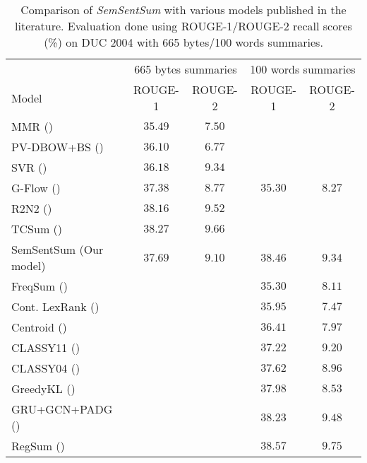 \documentclass{article}
\begin{document}
\begin{table}
  \caption{Comparison of \textit{SemSentSum} with various models published in the
literature. Evaluation done using ROUGE-1/ROUGE-2 recall scores (\%) on DUC 2004 with 665 bytes/100 words summaries.}
\label{sum_perf}
  \centering
  \begin{tabular}{lcccc}
    \toprule
    & \multicolumn{2}{c}{665 bytes summaries} & \multicolumn{2}{c}{100 words summaries} \\
    Model & ROUGE-1 & ROUGE-2 & ROUGE-1 & ROUGE-2  \\
    \hline
    MMR \scriptsize{(\citet{bennani2018embedrank}}) & $35.49$ & $7.50$ & & \\
    PV-DBOW+BS \scriptsize{(\citet{mani2017multi}}) & $36.10$ & $6.77$ & & \\
    SVR \scriptsize{(\citet{li2007multi}}) & $36.18$ & $9.34$ & & \\
    G-Flow \scriptsize{(\citet{christensen2013towards}}) & $37.38$ & $8.77$ & $35.30$ & $8.27$\\
    R2N2 \scriptsize{(\citet{cao2015ranking}}) & $38.16$ & $9.52$ & & \\
    TCSum \scriptsize{(\citet{CaoLLW17}}) & $38.27$ & $9.66$ & & \\
    \hline
    SemSentSum (Our model) & $37.69$ & $9.10$ & $38.46$ & $9.34$ \\
    \hline
    FreqSum \scriptsize{(\citet{Nenkova2006})} & & & $35.30$ & $8.11$\\
    Cont. LexRank \scriptsize{(\citet{erkan2004lexrank})} & & &  $35.95$ & $7.47$\\
	Centroid \scriptsize{(\citet{radev2004centroid})} & & &  $36.41$ & $7.97$\\
    CLASSY11 \scriptsize{(\citet{conroy2011classy})} & & &  $37.22$ & $9.20$\\
    CLASSY04 \scriptsize{(\cite{conroy2004left})} & & &  $37.62$ & $8.96$\\
    GreedyKL \scriptsize{(\citet{Haghighi2009})} & & &  $37.98$ & $8.53$\\
    GRU+GCN+PADG \scriptsize{(\citet{Yasunaga17})} & & &  $38.23$ & $9.48$\\
    RegSum \scriptsize{(\citet{hong2014improving})} & & &  $38.57$ & $9.75$\\
    \bottomrule
  \end{tabular}
\end{table}
\end{document}
